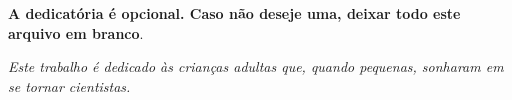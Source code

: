 \newpage
\thispagestyle{empty}
   \vspace*{\fill}
   \centering
   \noindent
	\textbf{A dedicatória é opcional. Caso não deseje uma, deixar todo este
	arquivo em branco}.

   \textit{Este trabalho é dedicado às crianças adultas que,
   quando pequenas, sonharam em se tornar cientistas.} \vspace*{\fill}
\newpage